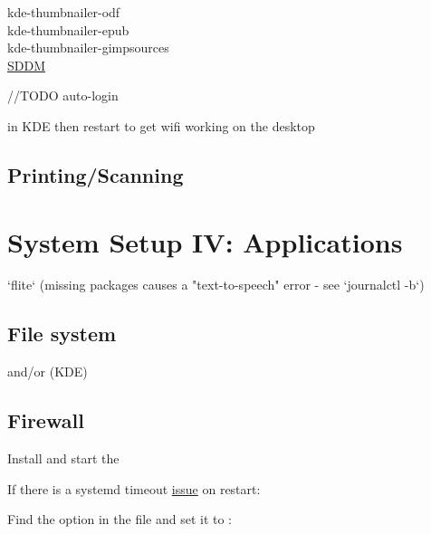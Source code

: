 
kde-thumbnailer-odf\\
kde-thumbnailer-epub\\
kde-thumbnailer-gimpsources\\


\href{https://wiki.archlinux.org/index.php/SDDM}{SDDM}

//TODO auto-login

 in KDE then restart to get wifi working on the desktop


\subsection{Printing/Scanning}



\section{System Setup IV: Applications}

`flite` (missing packages causes a "text-to-speech" error - see `journalctl -b`)


\subsection{File system}

 and/or  (KDE)

\subsection{Firewall}

Install  and start the 

If there is a systemd timeout \href{https://bugzilla.redhat.com/show_bug.cgi?id=1294415#c10}{issue} on restart: 
\begin{blocksection}
    Find the  option in the file and set it to :\\
\end{blocksection}

